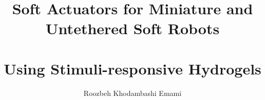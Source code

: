 \documentclass[12pt,letterpaper]{report}
\begin{document}
\title{Soft Actuators for Miniature and Untethered Soft Robots\\ \ \\ Using Stimuli-responsive Hydrogels}
\author{Roozbeh Khodambashi Emami}
\maketitle
\doublespace

%
\tableofcontents
\newpage

%
%

\end{document}
